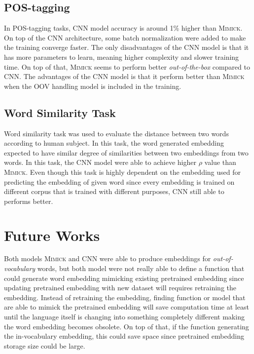 \subsection{POS-tagging}
In POS-tagging tasks, CNN model accuracy is around 1\% higher than
\textsc{Mimick}. On top of the CNN architecture, some batch
normalization were added to make the training converge faster. The
only disadvantages of the CNN model is that it has more parameters to
learn, meaning higher complexity and slower training time. On top of
that, \textsc{Mimick} seems to perform better \textit{out-of-the-box}
compared to CNN. The advantages of the CNN model is that it perform
better than \textsc{Mimick} when the OOV handling model is included in
the training.

\subsection{Word Similarity Task}
Word similarity task was used to evaluate the distance between two
words according to human subject. In this task, the word generated
embedding expected to have similar degree of similarities between two
embeddings from two words. In this task, the CNN model were able to
achieve higher $\rho$ value than \textsc{Mimick}. Even though this
task is highly dependent on the embedding used for predicting the
embedding of given word since every embedding is trained on different
corpus that is trained with different purposes, CNN still able to
performs better.

\section{Future Works}
Both models \textsc{Mimick} and CNN were able to produce embeddings
for \textit{out-of-vocabulary} words, but both model were not really
able to define a function that could generate word embedding mimicking
existing pretrained embedding since updating pretrained embedding with
new dataset will requires retraining the embedding. Instead of
retraining the embedding, finding function or model that are able to
mimick the pretrained embedding will save computation time at least
until the language itself is changing into something completely
different making the word embedding becomes obsolete. On top of that,
if the function generating the in-vocabulary embedding, this could
save space since pretrained embedding storage size could be large.